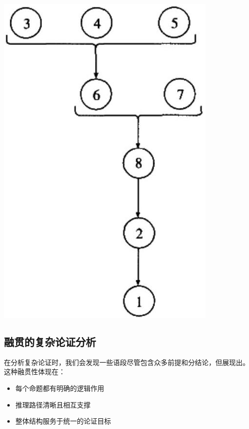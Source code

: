 \begin{center}
\includegraphics[width=\textwidth]{images/2025_05_15_6a28331d5e7c993ad07ag-074.jpg}
\end{center}

\subsection{融贯的复杂论证分析}

在分析复杂论证时，我们会发现一些语段尽管包含众多前提和分结论，但展现出。这种融贯性体现在：
\begin{itemize}
  \item 每个命题都有明确的逻辑作用
  \item 推理路径清晰且相互支撑
  \item 整体结构服务于统一的论证目标
\end{itemize}

